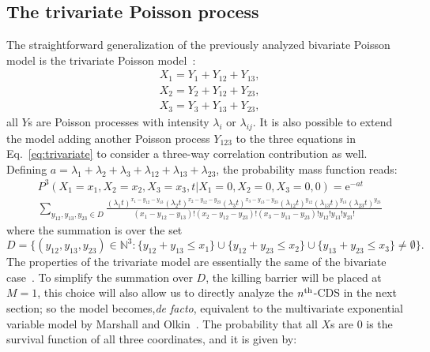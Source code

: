 \documentclass[a4paper,11pt]{amsart}
\theoremstyle{remark}
\newcommand{\ee}[1]{\mathrm{e}^{#1}}
\newcommand{\nth}{n\textsuperscript{th}}
\begin{document}
 \subsection{The trivariate Poisson process}
 \label{sec:tri_poisson}
 The straightforward generalization of the previously analyzed bivariate Poisson model is the trivariate Poisson model~\cite{kawamura_structure_1976}:
 \begin{equation}
  \label{eq:trivariate}
  \begin{aligned}
    &X_1=Y_1+Y_{12}+Y_{13},\\
    &X_2=Y_2+Y_{12}+Y_{23},\\
    &X_3=Y_3+Y_{13}+Y_{23},
  \end{aligned}
\end{equation}
all $Y$s are Poisson processes with intensity $\lambda_i$ or $\lambda_{ij}$. It is also possible to extend the model adding another Poisson process $Y_{123}$ to the three equations in Eq.~\eqref{eq:trivariate} to consider a three-way correlation contribution as well. Defining $a=\lambda_1+\lambda_2+\lambda_3+\lambda_{12}+\lambda_{13}+\lambda_{23}$, the probability mass function reads:
\begin{equation}
  \label{eq:trivariate_poisson_PMF}
  \begin{aligned}
    &P^3(X_1=x_1,X_2=x_2,X_3=x_3,t|X_1=0,X_2=0,X_3=0,0)=\ee{-at}\\
    &\sum_{y_{12},y_{13},y_{23}\in D}\frac{(\lambda_1t)^{x_1-y_{12}-y_{13}}(\lambda_2t)^{x_2-y_{12}-y_{23}}(\lambda_3t)^{x_3-y_{13}-y_{23}}(\lambda_{12}t)^{y_{12}}(\lambda_{13}t)^{y_{13}}(\lambda_{23}t)^{y_{23}}}{(x_1-y_{12}-y_{13})!(x_2-y_{12}-y_{23})!(x_3-y_{13}-y_{23})!y_{12}!y_{13}!y_{23}!}
  \end{aligned}
\end{equation}
where the summation is over the set
\begin{equation*}
  D=\{(y_{12},y_{13},y_{23})\in\mathbb{N}^3 : \{y_{12}+y_{13}\leq x_1\} \cup \{y_{12}+y_{23}\leq x_2\} \cup\{y_{13}+y_{23}\leq x_3\} \neq\emptyset\}.
\end{equation*}
The properties of the trivariate model are essentially the same of the bivariate case~\cite{kawamura_structure_1976}. To simplify the summation over $D$, the killing barrier will be placed at $M=1$, this choice will also allow us to directly analyze the $\nth$-CDS in the next section; so the model becomes,\emph{de facto}, equivalent to the multivariate exponential variable model by Marshall and Olkin~\cite{marshall_multivariate_1967}. The probability that all $X$s are $0$ is the survival function of all three coordinates, and it is given by:
\end{document}
